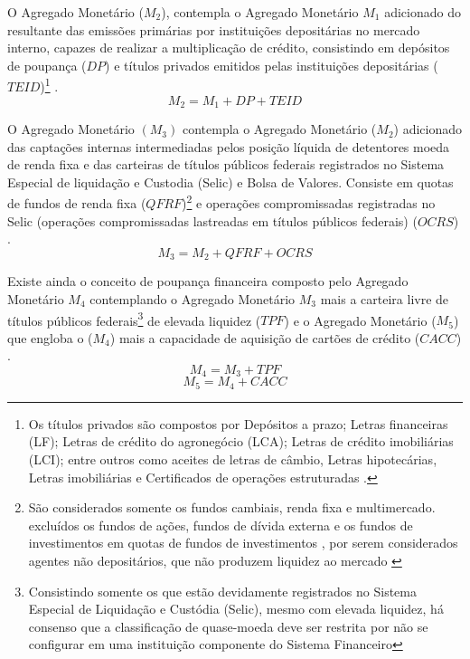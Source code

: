 \documentclass[12pt,12pt,openright,oneside,a4paper,chapter=TITLE,section=TITLE,subsection=TITLE,subsubsection=TITLE,english,french,spanish,portugues,sumario=tradicional]{abntex2}
\begin{document}
O Agregado Monetário (\(M_2\)), contempla o Agregado Monetário \(M_1\) adicionado do resultante das emissões primárias por instituições depositárias no mercado interno, capazes de realizar a multiplicação de crédito, consistindo em depósitos de poupança (\(DP\)) e títulos privados emitidos pelas instituições depositárias (\(TEID\))\footnote{Os títulos privados são compostos por Depósitos a prazo; Letras financeiras (LF); Letras de crédito do agronegócio (LCA); Letras de crédito imobiliárias (LCI); entre outros como aceites de letras de câmbio, Letras hipotecárias, Letras imobiliárias e Certificados de operações estruturadas \cite{sgs:mpa}.} \cite{sgs:mpa}.
\[
M_2 = M_1 + DP + TEID
\]

O Agregado Monetário \((M_3)\) contempla o Agregado Monetário (\(M_2\)) adicionado das captações internas intermediadas pelos posição líquida de detentores moeda de renda fixa e das carteiras de títulos públicos federais registrados no Sistema Especial de liquidação e Custodia (Selic) e Bolsa de Valores. Consiste em quotas de fundos de renda fixa (\(QFRF\))\footnote{São considerados somente os fundos cambiais, renda fixa  e multimercado. excluídos os fundos de ações, fundos de dívida externa e os fundos de investimentos em quotas de fundos de investimentos , por serem considerados agentes não depositários, que não produzem liquidez ao mercado \cite{sgs:mpa}} e operações compromissadas registradas no Selic (operações compromissadas lastreadas em títulos públicos federais) (\(OCRS\)) \cite{bcb:2019} \cite{sgs:mpa}.
\[
M_3 = M_2 + QFRF + OCRS
\]

Existe ainda o conceito de poupança financeira composto pelo Agregado Monetário \(M_4\) contemplando o Agregado Monetário \(M_3\) mais a carteira livre de títulos públicos federais\footnote{Consistindo somente os que estão devidamente registrados no Sistema Especial de Liquidação e Custódia (Selic), mesmo com elevada liquidez, há consenso que a classificação de quase-moeda deve ser restrita por não se configurar em uma instituição componente do Sistema Financeiro} de elevada liquidez (\(TPF\)) \cite{bcb:2019} e o Agregado Monetário (\(M_5\)) que engloba o (\(M_4\)) mais a capacidade de aquisição de cartões de crédito (\(CACC\)) .
\[
M_4 = M_3 + TPF
\]
\[
M_5 = M_4 + CACC
\]
\end{document}
